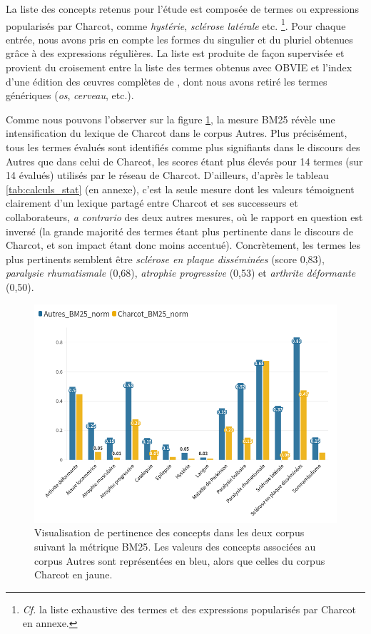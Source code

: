 La liste des concepts retenus pour l'étude est composée de termes ou expressions popularisés par Charcot, comme \textit{hystérie}, \textit{sclérose latérale} etc. \citep[p.~1102]{camargo2024} \footnote{\textit{Cf.} la liste exhaustive des termes et des expressions popularisés par Charcot en annexe.}. Pour chaque entrée, nous avons pris en compte les formes du singulier et du pluriel obtenues grâce à des expressions régulières. La liste est  produite de façon supervisée et provient du croisement entre la liste des termes obtenus avec OBVIE et l'index d'une édition des \oe{}uvres complètes de \cite[pp.~493--507]{charcot1892oeuvres}, dont nous avons retiré les termes génériques (\textit{os}, \textit{cerveau}, etc.).

Comme nous pouvons l'observer sur la figure \ref{fig:bm25}, la mesure \textsc{BM25} révèle une intensification du lexique de Charcot dans le corpus \og{}Autres\fg{}. Plus précisément, tous les termes évalués sont identifiés comme plus signifiants dans le discours des \og{}Autres\fg{} que dans celui de Charcot, les scores étant plus élevés pour 14 termes (sur 14 évalués) utilisés par le réseau de Charcot. D'ailleurs, d'après le tableau \ref{tab:calculs_stat} (en annexe), c'est la seule mesure dont les valeurs témoignent clairement d'un lexique partagé entre Charcot et ses successeurs et collaborateurs, \textit{a contrario} des deux autres mesures, où le rapport en question est inversé (la grande majorité des termes étant plus pertinente dans le discours de Charcot, et son impact étant donc moins accentué). Concrètement, les termes les plus pertinents semblent être \textit{sclérose en plaque disséminées} (score 0,83), \textit{paralysie rhumatismale} (0,68), \textit{atrophie progressive} (0,53) et \textit{arthrite déformante} (0,50).

\begin{figure}[!h]
    \centering
    \includegraphics[width=1\textwidth]{img/Charcot_Autres_250523.png}
    \caption{Visualisation de pertinence des concepts dans les deux corpus suivant la métrique \textsc{BM25}. Les valeurs des concepts associées au corpus \og{}Autres\fg{} sont représentées en bleu, alors que celles du corpus \og{}Charcot\fg{} en jaune.}
    \label{fig:bm25}
\end{figure}

